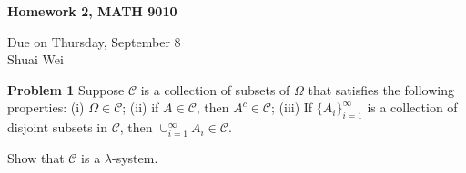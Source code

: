 \documentclass{article}
\begin{document}
\begin{center}

\textbf{Homework 2, MATH 9010}

Due on Thursday, September 8\\

Shuai Wei

\end{center}

\vspace{3 mm}

\noindent \textbf{Problem 1} Suppose $\mathcal{C}$ is a collection of subsets of $\Omega$ that satisfies the following properties:  (i) $\Omega \in \mathcal{C}$; (ii) if $A \in \mathcal{C}$, then $A^{c} \in \mathcal{C}$; (iii) If $\{A_{i}\}_{i = 1}^{\infty}$ is a collection of disjoint subsets in $\mathcal{C}$, then $\cup_{i=1}^{\infty}A_{i} \in \mathcal{C}$.

\vspace{2 mm}

Show that $\mathcal{C}$ is a $\lambda$-system.

\vspace{3 mm}
\end{document}
